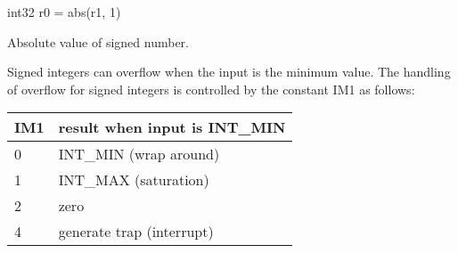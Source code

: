 \documentclass[forwardcom.tex]{subfiles}
\begin{document}
int32 r0 = abs(r1, 1)
\vspace{2mm}


Absolute value of signed number.
\vspace{2mm}

Signed integers can overflow when the input is the minimum value.
The handling of overflow for signed integers is controlled by the constant IM1 as follows:

\begin{longtable}{|p{12mm}|p{80mm}|}
\endfirsthead
\endhead
\hline
\bfseries IM1 & \bfseries result when input is INT\_MIN \\ \hline
0  & INT\_MIN (wrap around) \\ \hline
1  & INT\_MAX (saturation)  \\ \hline
2  & zero                   \\ \hline
4  & generate trap (interrupt) \\ \hline
\end{longtable}
\vspace{2mm}
\end{document}
